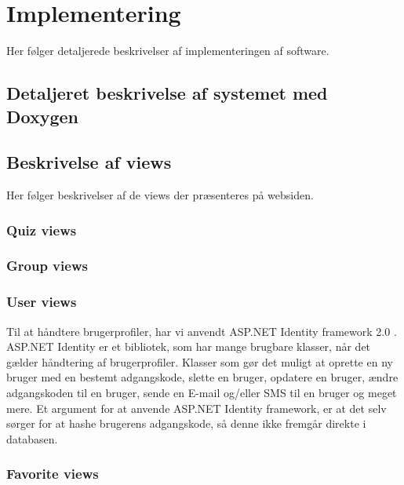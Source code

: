 \chapter{Implementering}

Her følger detaljerede beskrivelser af implementeringen af software.

\section{Detaljeret beskrivelse af systemet med Doxygen}


\section{Beskrivelse af views}\label{sec:views}
Her følger beskrivelser af de views der præsenteres på websiden.
\subsection{Quiz views}





\subsection{Group views}




\subsection{User views}
Til at håndtere brugerprofiler, har vi anvendt ASP.NET Identity framework 2.0 \citep{msdnIdentityFrameworkWeb}. ASP.NET Identity er et bibliotek, som har mange brugbare klasser, når det gælder håndtering af brugerprofiler. Klasser som gør det muligt at oprette en ny bruger med en bestemt adgangskode, slette en bruger, opdatere en bruger, ændre adgangskoden til en bruger, sende en E-mail og/eller SMS til en bruger og meget mere. Et argument for at anvende ASP.NET Identity framework, er at det selv sørger for at hashe brugerens adgangskode, så denne ikke fremgår direkte i databasen.



\subsection{Favorite views}


